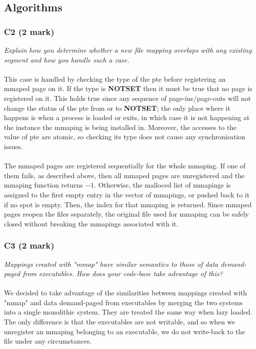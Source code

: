 \documentclass{report}
\newcommand{\question}[1]{\textit{#1} \ }
\newcommand{\const}[1]{\textcolor{BrickRed}{\textbf{#1}}}
\begin{document}
		\subsection*{Algorithms}
			\subsubsection*{C2 (2 mark)}
				\question{Explain how you determine whether a new file mapping overlaps 
				with any existing segment and how you handle such a case.}
				\\
				\\ This case is handled by checking the type of the pte before registering an mmaped page on it.
				If the type is \const{NOTSET} then it must be true that no page is registered on it.
				This holds true since any sequence of page-ins/page-outs will not change the status of
				the pte from or to \const{NOTSET}; the only place where it happens is when a process is loaded or exits,
				in which case it is not happening at the instance the mmaping is being installed in. Moreover, the accesses
				to the value of pte are atomic, so checking its type does not cause any synchronisation issues.
				\\
				\\ The mmaped pages are registered sequentially for the whole mmaping. If one of them fails, as described above, then
				all mmaped pages are unregistered and the mmaping function returns \const{$-1$}. Otherwise, the malloced list of mmapings
				is assigned to the first empty entry in the vector of mmapings, or pushed back to it if no spot is empty. Then, the
				index for that mmaping is returned. Since mmaped pages reopen the files separately, the original file used for mmaping can be safely closed
				without breaking the mmapings associated with it.
			
			\subsubsection*{C3 (2 mark)}
				\question{Mappings created with "mmap" have similar semantics to those of 
				data demand-paged from executables. How does your code-base take advantage 
				of this?}
				\\
				\\We decided to take advantage of the similarities between mappings created with "mmap" and data demand-paged from executables
				by merging the two systems into a single monolithic system. They are treated the same way when lazy loaded. 
				The only difference is that the executables are not writable, and so when we unregister an mmaping belonging to an executable,
				we do not write-back to the file under any circumstances.
\end{document}
